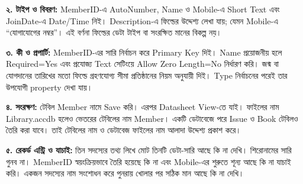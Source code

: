 \textbf{২. টাইপ ও বিবরণ:} MemberID-এ AutoNumber, Name ও Mobile-এ Short Text এবং JoinDate-এ Date/Time নিই। Description-এ ফিল্ডের উদ্দেশ্য লেখা যায়; যেমন Mobile-এ ``যোগাযোগের নম্বর''। এই বর্ণনা ফিল্ডের ডেটা টাইপ বা সংরক্ষিত মানের বিকল্প নয়।

\textbf{৩. কী ও প্রপার্টি:} MemberID-এর সারি নির্বাচন করে Primary Key দিই। Name প্রয়োজনীয় হলে Required=Yes এবং প্রযোজ্য Text সেটিংয়ে Allow Zero Length=No নির্ধারণ করি। জন্ম বা যোগদানের তারিখের মতো ফিল্ডে গ্রহণযোগ্য সীমা প্রতিষ্ঠানের নিয়ম অনুযায়ী দিই। Type নির্বাচনের পরেই তার উপযোগী property দেখা যায়।

\textbf{৪. সংরক্ষণ:} টেবিল Member নামে Save করি। এরপর Datasheet View-তে যাই। ফাইলের নাম Library.accdb হলেও ভেতরের টেবিলের নাম Member। একটি ডেটাবেজে পরে Issue ও Book টেবিলও তৈরি করা যাবে। তাই টেবিলের নাম ও ডেটাবেজ ফাইলের নাম আলাদা উদ্দেশ্য প্রকাশ করে।

\textbf{৫. রেকর্ড এন্ট্রি ও যাচাই:} তিন সদস্যের তথ্য লিখে মোট তিনটি ডেটা-সারি আছে কি না দেখি। শিরোনামের সারি গুনব না। MemberID স্বয়ংক্রিয়ভাবে তৈরি হয়েছে কি না এবং Mobile-এর শুরুতে শূন্য আছে কি না যাচাই করি। একজন সদস্যের নাম সংশোধন করে পুনরায় খোলার পর সঠিক মান আছে কি না দেখি।

